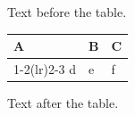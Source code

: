 \documentclass[12pt]{article}
\begin{document}
Text before the table.

\begin{tabular}{lll}\toprule A & B & C\\\cmidrule(lr){1-2}\morecmidrules\cmidrule(lr){2-3} d & e & f\\\bottomrule\end{tabular}

Text after the table.
\end{document}
